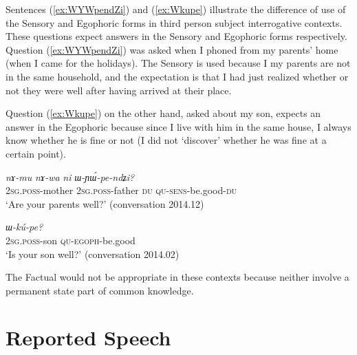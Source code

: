 \documentclass[11pt]{article}
\newcommand{\ipa}[1]{{\phon\textit{#1}}} %
\newcommand{\refb}[1]{(\ref{#1})}
\begin{document}
Sentences \refb{ex:WYWpendZi} and \refb{ex:Wkupe} illustrate the difference of use of the Sensory and Egophoric forms in third person subject interrogative contexts. These questions expect answers in the Sensory and Egophoric forms respectively. Question \refb{ex:WYWpendZi} was asked when I phoned from my parents' home (when I came for the holidays). The Sensory is used because I my parents are not in the same household, and the expectation is that I had just realized whether or not they were well after having arrived at their place. 

Question \refb{ex:Wkupe} on the other hand, asked about my son, expects an answer in the Egophoric because since I live with him in the same house, I always know whether he is fine or not (I did not `discover' whether he was fine at a certain point).

\begin{exe}
\ex \label{ex:WYWpendZi}
\gll 
\ipa{nɤ-mu}  	\ipa{nɤ-wa}  	\ipa{ni}  	\ipa{ɯ-ɲɯ́-pe-ndʑi?}  \\
\textsc{2sg.poss}-mother \textsc{2sg.poss}-father \textsc{du} \textsc{qu-sens}-be.good-\textsc{du} \\
\glt `Are your parents well?' (conversation 2014.12)
\end{exe}


\begin{exe}
\ex \label{ex:Wkupe}
\gll \ipa{nɤ-tɕɯ} \ipa{ɯ-kú-pe?}\\
\textsc{2sg.poss}-son \textsc{qu-egoph}-be.good\\
\glt `Is your son well?' (conversation 2014.02)
\end{exe}

The Factual would not be appropriate in these contexts because neither involve a permanent state part of common knowledge.


\section{Reported Speech} \label{sec:hybrid}
\end{document}
